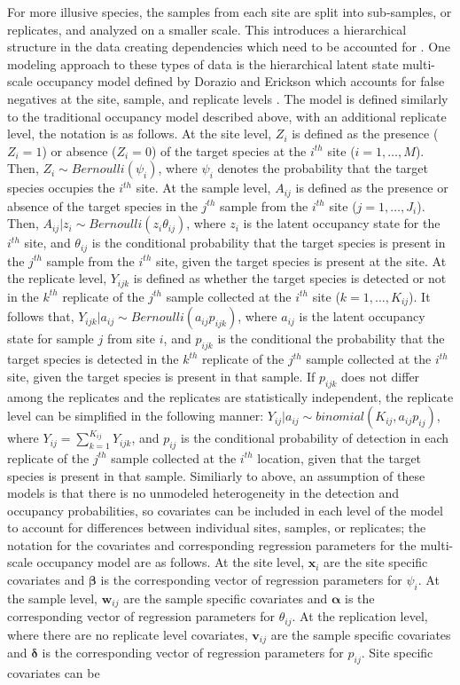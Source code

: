 \documentclass[12pt]{article}\usepackage[]{graphicx}\usepackage[]{color}
\begin{document}
For more illusive species, the samples from each site are split into sub-samples, or replicates, and analyzed on a smaller scale. This introduces a hierarchical structure in the data creating dependencies which need to be accounted for \cite{MacKenzie}. One modeling approach to these types of data is the hierarchical latent state multi-scale occupancy model defined by Dorazio and Erickson which accounts for false negatives at the site, sample, and replicate levels \cite{Dorazio_Erickson}. The model is defined similarly to the traditional occupancy model described above, with an additional replicate level, the notation is as follows. At the site level, $Z_i$ is defined as the presence ($Z_i = 1$) or absence ($Z_i = 0$) of the target species at the $i^{th}$ site ($i = 1, \dots, M$). Then, $Z_i \sim Bernoulli(\psi_i)$, where $\psi_i$ denotes the probability that the target species occupies the $i^{th}$ site. At the sample level, $A_{ij}$ is defined as the presence or absence of the target species in the $j^{th}$ sample from the $i^{th}$ site ($j = 1, \dots, J_i$). Then, $A_{ij}|z_i \sim Bernoulli(z_i\theta_{ij})$, where $z_i$ is the latent occupancy state for the $i^{th}$ site, and $\theta_{ij}$ is the conditional probability that the target species is present in the $j^{th}$ sample from the $i^{th}$ site, given the target species is present at the site. At the replicate level, $Y_{ijk}$ is defined as whether the target species is detected or not in the $k^{th}$ replicate of the $j^{th}$ sample collected at the $i^{th}$ site ($k = 1, \dots, K_{ij}$). It follows that, $Y_{ijk}|a_{ij} \sim Bernoulli(a_{ij}p_{ijk})$, where $a_{ij}$ is the latent occupancy state for sample $j$ from site $i$, and $p_{ijk}$ is the conditional the probability that the target species is detected in the $k^{th}$ replicate of the $j^{th}$ sample collected at the $i^{th}$ site, given the target species is present in that sample. If $p_{ijk}$ does not differ among the replicates and the replicates are statistically independent, the replicate level can be simplified in the following manner: $Y_{ij}|a_{ij} \sim binomial(K_{ij}, a_{ij}p_{ij})$, where $Y_{ij} = \sum_{k = 1}^{K_{ij}}Y_{ijk}$, and $p_{ij}$ is the conditional probability of detection in each replicate of the $j^{th}$ sample collected at the $i^{th}$ location, given that the target species is present in that sample. Similiarly to above, an assumption of these models is that there is no unmodeled heterogeneity in the detection and occupancy probabilities, so covariates can be included in each level of the model to account for differences between individual sites, samples, or replicates; the notation for the covariates and corresponding regression parameters for the multi-scale occupancy model are as follows. At the site level, $\bm{x}_i$ are the site specific covariates and $\bm{\beta}$ is the corresponding vector of regression parameters for $\psi_i$. At the sample level, $\bm{w}_{ij}$ are the sample specific covariates and $\bm{\alpha}$ is the corresponding vector of regression parameters for $\theta_{ij}$. At the replication level, where there are no replicate level covariates, $\bm{v}_{ij}$ are the sample specific covariates and $\bm{\delta}$ is the corresponding vector of regression parameters for $p_{ij}$. Site specific covariates can be 
\end{document}
